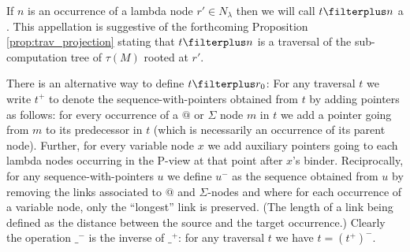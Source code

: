 If $n$ is an occurrence of a lambda node $r' \in N_\lambda$ then we
will call $t \filterplus n$ a . This appellation is suggestive of the
forthcoming Proposition \ref{prop:trav_projection} stating that $t
\filterplus n$ is a traversal of the sub-computation tree of
$\tau(M)$ rooted at $r'$.
\bigskip


\begin{remark}
\label{rem:tplus} There is an alternative way to define $t
\filterplus r_0$: For any traversal $t$ we write $t^+$ to denote the
sequence-with-pointers obtained from $t$ by adding pointers as
follows: for every occurrence of a $@$ or $\Sigma$ node $m$ in $t$
we add a pointer going from $m$ to its predecessor in $t$ (which is
necessarily an occurrence of its parent node). Further, for every
variable node $x$ we add auxiliary pointers going to each lambda
nodes occurring in the P-view at that point after $x$'s binder. %
Reciprocally, for any sequence-with-pointers $u$ we define $u^-$ as
the sequence obtained from $u$ by removing the links associated to
$@$ and $\Sigma$-nodes and where for each occurrence of a variable
node, only the ``longest'' link is preserved. (The length of a link
being defined as the distance between the source and the target
occurrence.) Clearly the operation $\_^-$ is the inverse of $\_^+$:
for any traversal $t$ we have $t= (t^+)^-$.

%


\end{remark}
